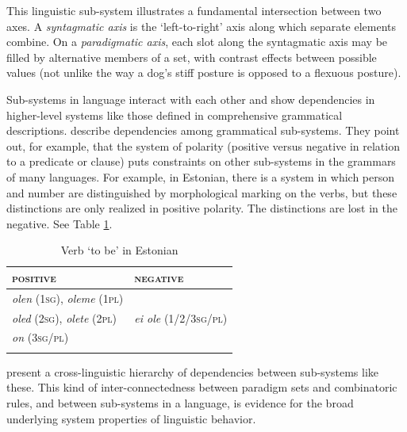 This linguistic sub-system illustrates a fundamental 
intersection between two axes. A \textit{syntagmatic axis} is the `left-to-right' axis along 
which separate elements combine. On a \textit{paradigmatic axis}, each slot along the syntagmatic axis
may be filled by alternative members of a set, with contrast 
effects between possible values (not unlike the way a dog's stiff posture 
is opposed to a flexuous posture). 



Sub-systems in language interact with each other and show dependencies 
in higher-level systems like those defined in comprehensive 
grammatical descriptions. \citet{aikhenvald_dependencies_1998} describe 
dependencies among grammatical sub-systems. They point out, for example, that 
the system of polarity (positive versus negative in relation to a 
predicate or clause) puts constraints on other sub-systems in the grammars of 
many languages. For example, in Estonian, there is a system in which person and number are 
distinguished by morphological marking on the verbs, but these 
distinctions are only realized in positive polarity. The distinctions 
are lost in the negative. See Table \ref{verbtobeinestonian}.





\begin{table}[h]
\centering
\begin{tabular}{ll}
\lsptoprule
\textsc{positive} & \textsc{negative} \\
\midrule
\textit{olen} (\textsc{1sg)}, \textit{oleme} (\textsc{1pl}) 
& \\

\textit{oled} (\textsc{2sg)}, \textit{olete }(\textsc{2pl)} & 
\textit{ei ole} (1/2/3\textsc{sg/pl}) \\

\textit{on} (\textsc{3sg/pl}) & \\
\lspbottomrule
\end{tabular}
\caption{Verb `to be' in Estonian}
\label{verbtobeinestonian}
\end{table}


\citet{aikhenvald_dependencies_1998} present a cross-linguistic hierarchy of dependencies between sub-systems like these. This kind of inter-connectedness between 
paradigm sets and combinatoric rules, and between sub-systems in a 
language, is evidence for the broad underlying system properties of 
linguistic behavior. 



